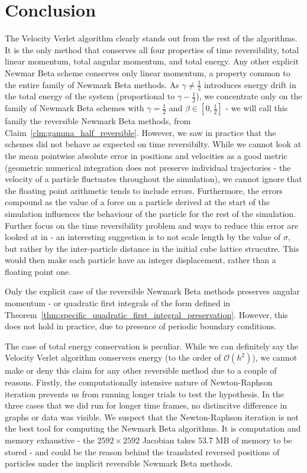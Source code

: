 \documentclass[../Main.tex]{subfiles}
\begin{document}
\section{Conclusion}

The Velocity Verlet algorithm clearly stands out from the rest of the algorithms. It is the only method that conserves all four properties of time reversibility, total linear momentum, total angular momentum, and total energy. Any other explicit Newmar Beta scheme conserves only linear momentum, a property common to the entire family of  Newmark Beta methods. As $\gamma \neq \frac{1}{2}$ introduces energy drift in the total energy of the system (proportional to $\gamma  - \frac{1}{2}$), we concentrate only on the family of Newmark Beta schemes with $\gamma = \frac{1}{2}$ and $\beta \in \left[0, \frac{1}{2}\right]$ - we will call this family the reversible Newmark Beta  methods, from Claim~\ref{clm:gamma_half_reversible}. However, we saw in practice that the schemes did not behave as expected on time reversibilty. While we cannot look at the mean pointwise absolute error in positions and velocities as a good metric (geometric numerical integration does not preserve individual trajectories - the velocity of a particle fluctuates throughout the simulation), we cannot ignore that the floating point arithmetic tends to include errors. Furthermore, the errors compound as the value of a force on a particle derived at the start of the simulation influences the behaviour of the particle for the rest of the simulation. Further focus on the time reversibility problem and ways to reduce this error are looked at in \cite{Levesque1993} - an interesting suggestion is to not scale length by the value of $\sigma$, but rather by the inter-particle distance in the initial cube lattice strucutre. This would then make each particle have an integer displacement, rather than a floating point one.

Only the explicit case of the reversible Newmark Beta methods preserves angular momentum - or quadratic first integrals of the form defined in Theorem~\ref{thm:specific_quadratic_first_integral_preservation}. However, this does not hold in practice, due to presence of periodic boundary conditions.

The case of total energy conservation is peculiar. While we can definitely say the Velocity Verlet algorithm conservers energy (to the order of $\mathcal{O}\left(h^{2}\right)$), we cannot make or deny this claim for any other reversible method due to a couple of reasons. Firstly, the computationally intensive nature of Newton-Raphson iteration prevents us from running longer trials to test the hypothesis. In the three cases that we did run for longer time frames, no distincitve difference in graphs or data was visible. We suspect that the Newton-Raphson iteration is not the best tool for computing the Newmark Beta algorithms. It is computation and memory exhaustive - the $2592\times 2592$ Jacobian takes 53.7 MB of memory to be stored - and could be the reason behind the translated reversed positions of particles under the implicit reversible Newmark Beta methods.
\end{document}
